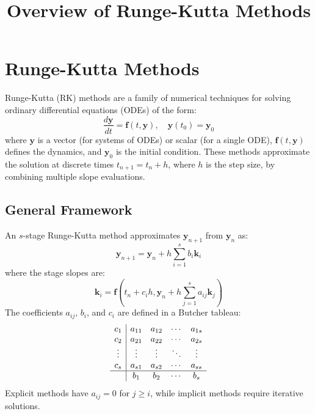 \documentclass[a4paper,12pt]{article}
\begin{document}
\title{Overview of Runge-Kutta Methods}
\author{}
\date{}
\maketitle

\section*{Runge-Kutta Methods}

Runge-Kutta (RK) methods are a family of numerical techniques for solving ordinary differential equations (ODEs) of the form:
\begin{equation}
\frac{d\mathbf{y}}{dt} = \mathbf{f}(t, \mathbf{y}), \quad \mathbf{y}(t_0) = \mathbf{y}_0
\end{equation}
where \(\mathbf{y}\) is a vector (for systems of ODEs) or scalar (for a single ODE), \(\mathbf{f}(t, \mathbf{y})\) defines the dynamics, and \(\mathbf{y}_0\) is the initial condition. These methods approximate the solution at discrete times \(t_{n+1} = t_n + h\), where \(h\) is the step size, by combining multiple slope evaluations.

\subsection*{General Framework}
An \(s\)-stage Runge-Kutta method approximates \(\mathbf{y}_{n+1}\) from \(\mathbf{y}_n\) as:
\begin{equation}
\mathbf{y}_{n+1} = \mathbf{y}_n + h \sum_{i=1}^s b_i \mathbf{k}_i
\end{equation}
where the stage slopes are:
\begin{equation}
\mathbf{k}_i = \mathbf{f}\left(t_n + c_i h, \mathbf{y}_n + h \sum_{j=1}^s a_{ij} \mathbf{k}_j\right)
\end{equation}
The coefficients \(a_{ij}\), \(b_i\), and \(c_i\) are defined in a Butcher tableau:
\[
\begin{array}{c|cccc}
c_1 & a_{11} & a_{12} & \cdots & a_{1s} \\
c_2 & a_{21} & a_{22} & \cdots & a_{2s} \\
\vdots & \vdots & \vdots & \ddots & \vdots \\
c_s & a_{s1} & a_{s2} & \cdots & a_{ss} \\
\hline
& b_1 & b_2 & \cdots & b_s
\end{array}
\]
Explicit methods have \(a_{ij} = 0\) for \(j \geq i\), while implicit methods require iterative solutions.
\end{document}
